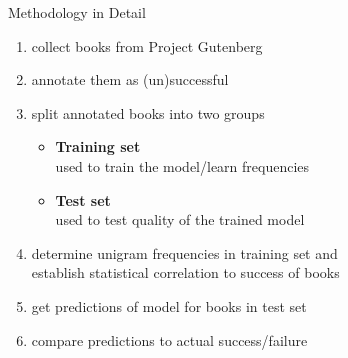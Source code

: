\documentclass[professionalfonts, xcolor={usenames,svgnames,x11names,table}]{beamer}
\begin{document}
\begin{frame}[fragile]{Methodology in Detail}
    \begin{enumerate}
        \item<1-> collect books from Project Gutenberg
        \item<2-> annotate them as (un)successful\\
        \item<3-> split annotated books into two groups\\
            \begin{itemize}
                \item \textbf{Training set}\\
                    used to train the model\slash learn frequencies\\
                \item \textbf{Test set}\\
                    used to test quality of the trained model
            \end{itemize}
        \item<4-> determine unigram frequencies in training set and\\
            establish statistical correlation to success of books
        \item<5-> get predictions of model for books in test set
        \item<6-> compare predictions to actual success\slash failure 
    \end{enumerate}
\end{frame}
\end{document}
